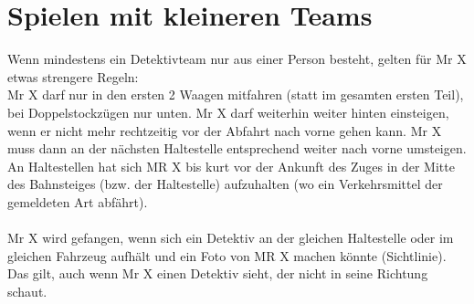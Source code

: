 \documentclass[12pt,a4paper]{article}
\begin{document}
\section{Spielen mit kleineren Teams}
Wenn mindestens ein Detektivteam nur aus einer Person besteht, gelten für Mr X etwas strengere Regeln:\\
Mr X darf nur in den ersten 2 Waagen mitfahren (statt im gesamten ersten Teil), bei Doppelstockzügen nur unten.
Mr X darf weiterhin weiter hinten einsteigen, wenn er nicht mehr rechtzeitig vor der Abfahrt nach vorne gehen kann.
Mr X muss dann an der nächsten Haltestelle entsprechend weiter nach vorne umsteigen.\\
An Haltestellen hat sich MR X bis kurt vor der Ankunft des Zuges in der Mitte des Bahnsteiges (bzw. der Haltestelle) aufzuhalten (wo ein Verkehrsmittel der gemeldeten Art abfährt).\\
\\
Mr X wird gefangen, wenn sich ein Detektiv an der gleichen Haltestelle oder im gleichen Fahrzeug aufhält und ein Foto von MR X machen könnte (Sichtlinie). Das gilt, auch wenn Mr X einen Detektiv sieht, der nicht in seine Richtung schaut.
\end{document}
